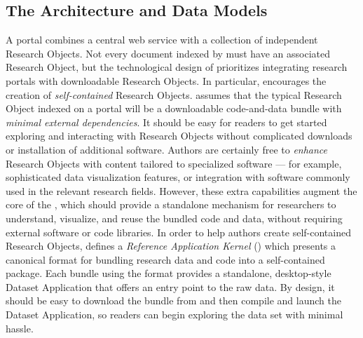 \documentclass[10pt,letterpaper]{article}
\begin{document}
\subsection{The {\lMOSAIC} Architecture and Data Models}
A {\MOSAIC} portal combines a central web service with a 
collection of independent Research Objects.  Not every 
document indexed by {\MOSAIC} must have an associated 
Research Object, but the technological design of 
{\MOSAIC} prioritizes integrating research portals 
with downloadable Research Objects.
\p{}
In particular, {\MOSAIC} encourages the 
creation of \textit{self-contained} Research Objects.  
{\lfMOSAIC} assumes that the 
typical Research Object indexed on a {\MOSAIC} portal 
will be a downloadable code-and-data bundle 
with \textit{minimal external dependencies}.  
It should be easy for readers to get 
started exploring and interacting with Research Objects 
without complicated downloads or installation of 
additional software.  Authors are certainly free 
to \textit{enhance} Research Objects with 
content tailored to specialized software --- for 
example, sophisticated data visualization features, 
or integration with software commonly used in the 
relevant research fields.  However, these extra capabilities 
augment the core of the {\RO}, which should 
provide a standalone mechanism for researchers to understand, 
visualize, and reuse the bundled code and data, without 
requiring external software or code libraries.
\p{}
In order to help authors create self-contained 
Research Objects, {\MOSAIC} defines a 
\textit{Reference Application Kernel} ({\RAK}) 
which presents a canonical format for bundling 
research data and code into a self-contained 
package.   
Each {\RO} bundle using 
the {\RAK} format provides a standalone, desktop-style 
Dataset Application that offers an entry point to 
the raw data.  By design, it should be easy 
to download the {\RAK} bundle from {\MOSAIC} and 
then compile and launch the Dataset Application, so 
readers can begin exploring the data set with 
minimal hassle.  
\end{document}
